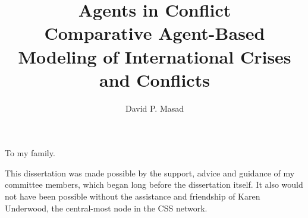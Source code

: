 \documentclass[11 pt]{report}
\begin{document}
\title{Agents in Conflict\\
            Comparative Agent-Based Modeling of International Crises and Conflicts}
\author{David P. Masad}













\signaturepage

\titlepage

\copyrightpage


\dedicationpage

\noindent To my family.


\acknowledgementspage

\noindent This dissertation was made possible by the support, advice and guidance of my committee members, which began long before the dissertation itself. It also would not have been possible without the assistance and friendship of Karen Underwood, the central-most node in the CSS network.
\end{document}
